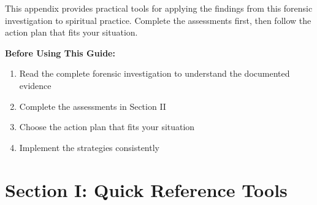 \documentclass[11pt,twoside]{book}
\begin{document}
\normalfont\justifying
This appendix provides practical tools for applying the findings from this forensic investigation to spiritual practice. Complete the assessments first, then follow the action plan that fits your situation.

\textbf{\textbf{Before Using This Guide:}}
\begin{enumerate}
\item Read the complete forensic investigation to understand the documented evidence
\item Complete the assessments in Section II
\item Choose the action plan that fits your situation
\item Implement the strategies consistently
\end{enumerate}
\section*{Section I: Quick Reference Tools}
\label{sec:org8ddc8f4}
\end{document}

